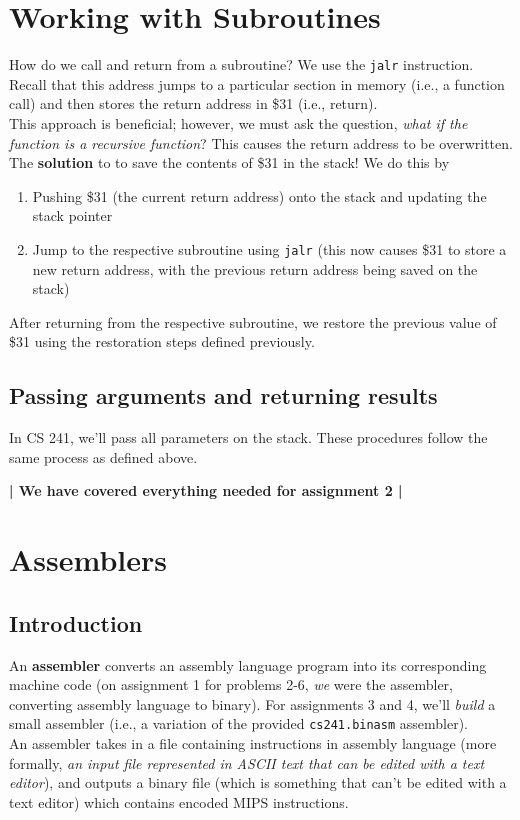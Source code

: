 \documentclass{report}
\begin{document}
\section{Working with Subroutines}
How do we call and return from a subroutine? We use the \texttt{jalr} instruction. Recall that this address jumps to a particular section in memory (i.e., a function call) and then stores the return address in \$31 (i.e., return).\\
This approach is beneficial; however, we must ask the question, \textit{what if the function is a recursive function}? This causes the return address to be overwritten.\\
The \textbf{solution} to to save the contents of \$31 in the stack! We do this by
\begin{enumerate}
\item Pushing \$31 (the current return address) onto the stack and updating the stack pointer 
\item Jump to the respective subroutine using \texttt{jalr} (this now causes \$31 to store a new return address, with the previous return address being saved on the stack)
\end{enumerate}
After returning from the respective subroutine, we restore the previous value of \$31 using the restoration steps defined previously.
\subsection{Passing arguments and returning results}
In CS 241, we'll pass all parameters on the stack. These procedures follow the same process as defined above.
\begin{center}
\textbf{| We have covered everything needed for assignment 2 |}
\end{center}
\section{Assemblers}
\subsection{Introduction}
An \textbf{assembler} converts an assembly language program into its corresponding machine code (on assignment 1 for problems 2-6, \textit{we} were the assembler, converting assembly language to binary). For assignments 3 and 4, we'll \textit{build} a small assembler (i.e., a variation of the provided \texttt{cs241.binasm} assembler).\\
An assembler takes in a file containing instructions in assembly language (more formally, \textit{an input file represented in ASCII text that can be edited with a text editor}), and outputs a binary file (which is something that can't be edited with a text editor) which contains encoded MIPS instructions.
\end{document}
